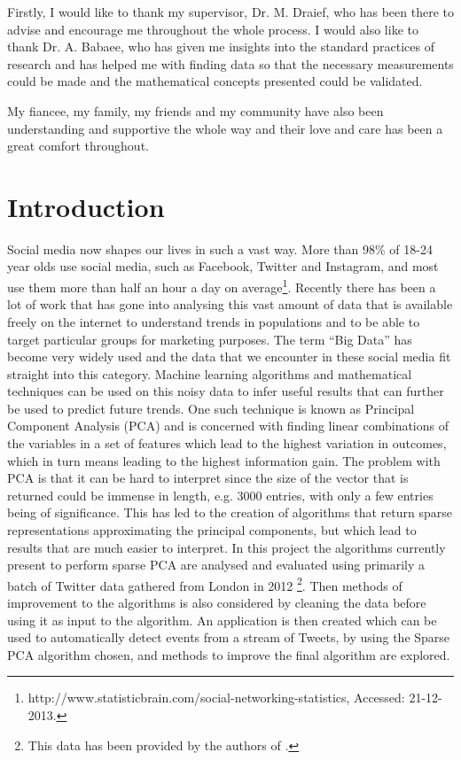\documentclass[11pt,a4paper]{article}
\begin{document}
Firstly, I would like to thank my supervisor, Dr. M. Draief, who has been there to advise and encourage me throughout the whole process. I would also like to thank Dr. A. Babaee, who has given me insights into the standard practices of research and has helped me with finding data so that the necessary measurements could be made and the mathematical concepts presented could be validated. 

My fiancee, my family, my friends and my community have also been understanding and supportive the whole way and their love and care has been a great comfort throughout.
\clearpage
\tableofcontents
\newpage
{}

\section{Introduction}
Social media now shapes our lives in such a vast way. More than $98\%$ of 18-24 year olds use social media, such as Facebook, Twitter and Instagram, and most use them more than half an hour a day on average\footnote{http://www.statisticbrain.com/social-networking-statistics, Accessed: 21-12-2013. }. Recently there has been a lot of work that has gone into analysing this vast amount of data that is available freely on the internet to understand trends in populations and to be able to target particular groups for marketing purposes. The term ``Big Data'' has become very widely used and the data that we encounter in these social media fit straight into this category. Machine learning algorithms and mathematical techniques can be used on this noisy data to infer useful results that can further be used to predict future trends. 
One such technique is known as Principal Component Analysis (PCA) and is concerned with finding linear combinations of the variables in a set of features which lead to the highest variation in outcomes, which in turn means leading to the highest information gain. The problem with PCA is that it can be hard to interpret since the size of the vector that is returned could be immense in length, e.g. 3000 entries, with only a few entries being of significance. This has led to the creation of algorithms that return sparse representations approximating the principal components, but which lead to results that are much easier to interpret. In this project the algorithms currently present to perform sparse PCA are analysed and evaluated using primarily a batch of Twitter data gathered from London in 2012 \footnote{This data has been provided by the authors of \cite{microblogs}.}. Then methods of improvement to the algorithms is also considered by cleaning the data before using it as input to the algorithm. An application is then created which can be used to automatically detect events from a stream of Tweets, by using the Sparse PCA algorithm chosen, and methods to improve the final algorithm are explored. 
\end{document}
